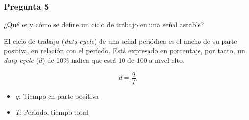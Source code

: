 \documentclass[../procedimientos.tex]{subfiles}
\begin{document}
\subsubsection*{Pregunta 5}
\begin{em}
  ¿Qué es y cómo se define un ciclo de trabajo en una señal astable?
\end{em}

El ciclo de trabajo (\textit{duty cycle}) de una señal periódica es el ancho 
de su parte positiva, en relación con el período. Está expresado en 
porcentaje, por tanto, un \textit{duty cycle} ($d$) de 10\% indica que está 10 
de 100 a nivel alto.

\[ d = \frac{q}{T} \]

\begin{itemize}
  \item $q$: Tiempo en parte positiva
  \item $T$: Periodo, tiempo total
\end{itemize}
\end{document}
